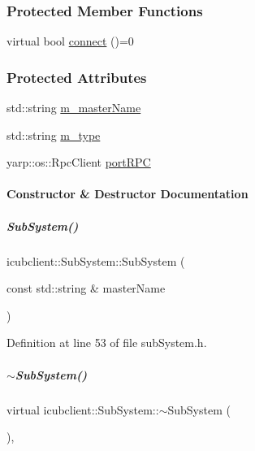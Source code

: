 \subsubsection*{Protected Member Functions}
\begin{DoxyCompactItemize}
\item 
virtual bool \hyperlink{group__icubclient__subsystems_a5fc84b6e51ec56f91323280b7da52dc8}{connect} ()=0
\end{DoxyCompactItemize}
\subsubsection*{Protected Attributes}
\begin{DoxyCompactItemize}
\item 
std\+::string \hyperlink{group__icubclient__subsystems_adca65267b02a9c622564ef8b8eb6508a}{m\+\_\+master\+Name}
\item 
std\+::string \hyperlink{group__icubclient__subsystems_a3f3b0afe9c5bfd0e915eaca30d3507a4}{m\+\_\+type}
\item 
yarp\+::os\+::\+Rpc\+Client \hyperlink{group__icubclient__subsystems_a20145cab1bbdc89b0e143e52a66e4760}{port\+R\+PC}
\end{DoxyCompactItemize}


\paragraph{Constructor \& Destructor Documentation}
\mbox{\label{group__icubclient__subsystems_a63bf4e6d5805ab7d3f3b209219543477}} 
\subparagraph{\texorpdfstring{Sub\+System()}{SubSystem()}}
{\footnotesize\ttfamily icubclient\+::\+Sub\+System\+::\+Sub\+System (\begin{DoxyParamCaption}\item[{const std\+::string \&}]{master\+Name }\end{DoxyParamCaption})\hspace{0.3cm}{\ttfamily [inline]}}



Definition at line 53 of file sub\+System.\+h.

\mbox{\label{group__icubclient__subsystems_aa0f79f798567683b2941858c53959cae}} 
\subparagraph{\texorpdfstring{$\sim$\+Sub\+System()}{~SubSystem()}}
{\footnotesize\ttfamily virtual icubclient\+::\+Sub\+System\+::$\sim$\+Sub\+System (\begin{DoxyParamCaption}{ }\end{DoxyParamCaption})\hspace{0.3cm}{\ttfamily [inline]}, {\ttfamily [virtual]}}



